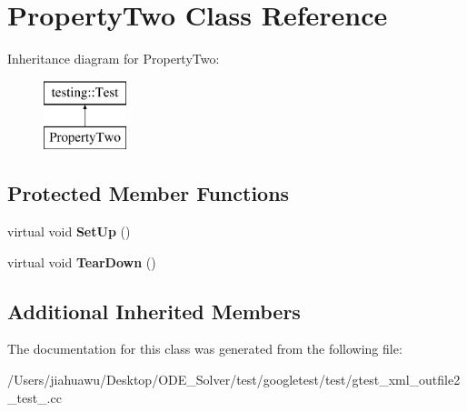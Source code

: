 \hypertarget{class_property_two}{}\section{Property\+Two Class Reference}
\label{class_property_two}
Inheritance diagram for Property\+Two\+:\begin{figure}[H]
\begin{center}
\leavevmode
\includegraphics[height=2.000000cm]{class_property_two}
\end{center}
\end{figure}
\subsection*{Protected Member Functions}
\begin{DoxyCompactItemize}
\item 
\mbox{\label{class_property_two_aa3ab39cf4e6c751cb0788c575bf92ca2}} 
virtual void {\bfseries Set\+Up} ()
\item 
\mbox{\label{class_property_two_aa4ffb2b9dddeba69f0f9baf133f06ef2}} 
virtual void {\bfseries Tear\+Down} ()
\end{DoxyCompactItemize}
\subsection*{Additional Inherited Members}


The documentation for this class was generated from the following file\+:\begin{DoxyCompactItemize}
\item 
/\+Users/jiahuawu/\+Desktop/\+O\+D\+E\+\_\+\+Solver/test/googletest/test/gtest\+\_\+xml\+\_\+outfile2\+\_\+test\+\_\+.\+cc\end{DoxyCompactItemize}
